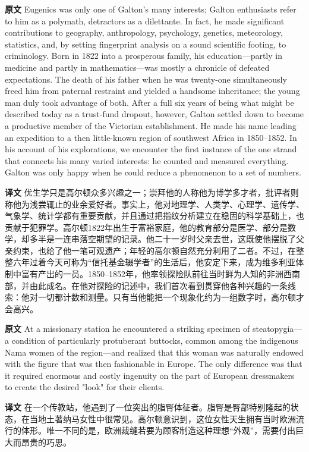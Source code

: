 \documentclass[UTF8,zihao=-4]{ctexart}
\newcommand{\BodyFont}{\fontsize{10.5pt}{15.5pt}\selectfont}
\renewenvironment{quote}{\par\noindent\begingroup\BodyFont}{\par\endgroup}
\begin{document}
\begin{quote}
\noindent\textbf{原文} Eugenics was only one of Galton's many interests; Galton enthusiasts refer to him as a polymath, detractors as a dilettante. In fact, he made significant contributions to geography, anthropology, psychology, genetics, meteorology, statistics, and, by setting fingerprint analysis on a sound scientific footing, to criminology. Born in 1822 into a prosperous family, his education---partly in medicine and partly in mathematics---was mostly a chronicle of defeated expectations. The death of his father when he was twenty-one simultaneously freed him from paternal restraint and yielded a handsome inheritance; the young man duly took advantage of both. After a full six years of being what might be described today as a trust-fund dropout, however, Galton settled down to become a productive member of the Victorian establishment. He made his name leading an expedition to a then little-known region of southwest Africa in 1850--1852. In his account of his explorations, we encounter the first instance of the one strand that connects his many varied interests: he counted and measured everything. Galton was only happy when he could reduce a phenomenon to a set of numbers.

\smallskip
\noindent\textbf{译文} 优生学只是高尔顿众多兴趣之一；崇拜他的人称他为博学多才者，批评者则称他为浅尝辄止的业余爱好者。事实上，他对地理学、人类学、心理学、遗传学、气象学、统计学都有重要贡献，并且通过把指纹分析建立在稳固的科学基础上，也贡献于犯罪学。高尔顿1822年出生于富裕家庭，他的教育部分是医学、部分是数学，却多半是一连串落空期望的记录。他二十一岁时父亲去世，这既使他摆脱了父亲约束，也给了他一笔可观遗产；年轻的高尔顿自然充分利用了二者。不过，在整整六年过着今天可称为“信托基金辍学者”的生活后，他安定下来，成为维多利亚体制中富有产出的一员。1850--1852年，他率领探险队前往当时鲜为人知的非洲西南部，并由此成名。在他对探险的记述中，我们首次看到贯穿他各种兴趣的一条线索：他对一切都计数和测量。只有当他能把一个现象化约为一组数字时，高尔顿才会高兴。
\end{quote}

\begin{quote}
\noindent\textbf{原文} At a missionary station he encountered a striking specimen of steatopygia---a condition of particularly protuberant buttocks, common among the indigenous Nama women of the region---and realized that this woman was naturally endowed with the figure that was then fashionable in Europe. The only difference was that it required enormous and costly ingenuity on the part of European dressmakers to create the desired "look" for their clients.

\smallskip
\noindent\textbf{译文} 在一个传教站，他遇到了一位突出的脂臀体征者。脂臀是臀部特别隆起的状态，在当地土著纳马女性中很常见。高尔顿意识到，这位女性天生拥有当时欧洲流行的体形。唯一不同的是，欧洲裁缝若要为顾客制造这种理想“外观”，需要付出巨大而昂贵的巧思。
\end{quote}
\end{document}
